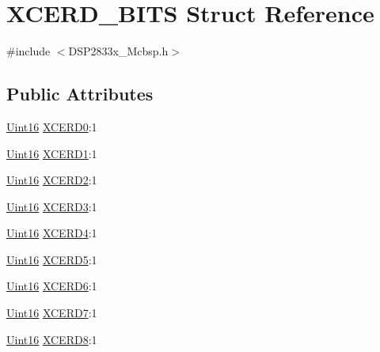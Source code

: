 \hypertarget{struct_x_c_e_r_d___b_i_t_s}{}\section{X\+C\+E\+R\+D\+\_\+\+B\+I\+T\+S Struct Reference}
\label{struct_x_c_e_r_d___b_i_t_s}


{\ttfamily \#include $<$D\+S\+P2833x\+\_\+\+Mcbsp.\+h$>$}

\subsection*{Public Attributes}
\begin{DoxyCompactItemize}
\item 
\hyperlink{_d_s_p2833x___device_8h_a59a9f6be4562c327cbfb4f7e8e18f08b}{Uint16} \hyperlink{struct_x_c_e_r_d___b_i_t_s_a56634516eb7ed9bf981ba529fe12423f}{X\+C\+E\+R\+D0}\+:1
\item 
\hyperlink{_d_s_p2833x___device_8h_a59a9f6be4562c327cbfb4f7e8e18f08b}{Uint16} \hyperlink{struct_x_c_e_r_d___b_i_t_s_a72286079d3c883e146dbd0c4d0beea05}{X\+C\+E\+R\+D1}\+:1
\item 
\hyperlink{_d_s_p2833x___device_8h_a59a9f6be4562c327cbfb4f7e8e18f08b}{Uint16} \hyperlink{struct_x_c_e_r_d___b_i_t_s_a6b40535f4823975122a160f4daf8a0c4}{X\+C\+E\+R\+D2}\+:1
\item 
\hyperlink{_d_s_p2833x___device_8h_a59a9f6be4562c327cbfb4f7e8e18f08b}{Uint16} \hyperlink{struct_x_c_e_r_d___b_i_t_s_a9b918c5851f05299844212ea3a2cc279}{X\+C\+E\+R\+D3}\+:1
\item 
\hyperlink{_d_s_p2833x___device_8h_a59a9f6be4562c327cbfb4f7e8e18f08b}{Uint16} \hyperlink{struct_x_c_e_r_d___b_i_t_s_a7eb465061bc9018bd23b1ecef8e54bab}{X\+C\+E\+R\+D4}\+:1
\item 
\hyperlink{_d_s_p2833x___device_8h_a59a9f6be4562c327cbfb4f7e8e18f08b}{Uint16} \hyperlink{struct_x_c_e_r_d___b_i_t_s_a0f86288b0e1f80519e88f3e3181668a5}{X\+C\+E\+R\+D5}\+:1
\item 
\hyperlink{_d_s_p2833x___device_8h_a59a9f6be4562c327cbfb4f7e8e18f08b}{Uint16} \hyperlink{struct_x_c_e_r_d___b_i_t_s_af60dc2cf5efd89e252693cf56e6c8168}{X\+C\+E\+R\+D6}\+:1
\item 
\hyperlink{_d_s_p2833x___device_8h_a59a9f6be4562c327cbfb4f7e8e18f08b}{Uint16} \hyperlink{struct_x_c_e_r_d___b_i_t_s_a9616cac924264c4b73fd0d1fbdbce157}{X\+C\+E\+R\+D7}\+:1
\item 
\hyperlink{_d_s_p2833x___device_8h_a59a9f6be4562c327cbfb4f7e8e18f08b}{Uint16} \hyperlink{struct_x_c_e_r_d___b_i_t_s_aed6197031934b810fbb06e91f031f9fa}{X\+C\+E\+R\+D8}\+:1

\end{DoxyCompactItemize}
